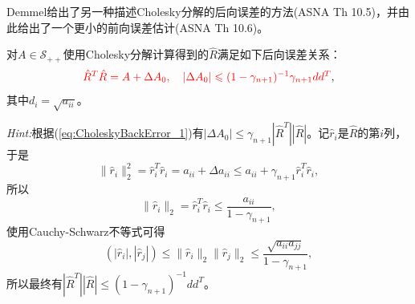 \documentclass[a4paper,10pt]{ctexart}
\begin{document}
Demmel给出了另一种描述Cholesky分解的后向误差的方法(ASNA Th 10.5)，并由此给出了一个更小的前向误差估计(ASNA Th 10.6)。
\begin{theorem}\label{th:CholeskyDecError}
    对$ A\in \mathcal{S}_{++} $使用Cholesky分解计算得到的$ \hat{R} $满足如下后向误差关系：
    \begin{equation}
        \textcolor{red}{\hat{R}^T\hat{R} = A+\Delta A_0,\quad |\Delta A_0| \leqslant (1-\gamma_{n+1})^{-1}\gamma_{n+1} dd^T},
    \end{equation}
    其中$ d_i = \sqrt{a_{ii}}  $。
\end{theorem}
\noindent \emph{Hint:}根据(\ref{eq:CholeskyBackError_1})有$ |\Delta A_0|\leqslant \gamma_{n+1}|\hat{R}^T| |\hat{R}| $。记$ \hat{r}_i $是$ \hat{R} $的第$ i $列，于是
\[
    \| \hat{r}_i \|_2^2 = \hat{r}_i^T \hat{r}_i = a_{ii} + \Delta a_{ii} \leqslant a_{ii} + \gamma_{n+1} \hat{r}_i^T \hat{r}_i,
\]
所以
\[
    \| \hat{r}_i \|_2 = \hat{r}_i^T \hat{r}_i \leqslant \frac{a_{ii}}{1-\gamma_{n+1}},
\]
使用Cauchy-Schwarz不等式可得
\[
    (|\hat{r}_i|, |\hat{r}_j|)\leqslant \| \hat{r}_i \|_2 \| \hat{r}_j \|_2 \leqslant \frac{\sqrt{a_{ii}a_{jj}}}{1-\gamma_{n+1}},
\]
所以最终有$ |\hat{R}^T| |\hat{R}| \leqslant (1-\gamma_{n+1})^{-1} d d^T $。
\end{document}
